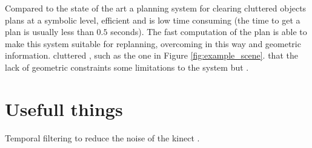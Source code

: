\mbox{} 

Compared to the state of the art a planning system for  clearing  cluttered objects  plans  at a symbolic level,  efficient and  is low time consuming  (the time to get a plan is usually less than $0.5$ seconds). The fast computation of the plan is able to make this system suitable for replanning, overcoming in this way   and geometric information.   cluttered , such as the one in Figure \ref{fig:example_scene}.  that the lack of  geometric constraints  some limitations to the system\DM{,} but .  






\iffalse
\section{Usefull things}
Temporal filtering to reduce the noise of the kinect	 \citep{SSS147762}.

